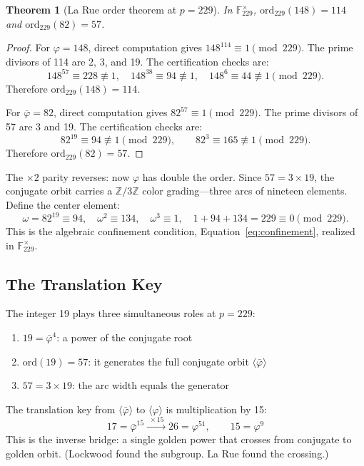 \documentclass[12pt,oneside]{article}
\theoremstyle{principia}
\newtheorem{theorem}{Theorem}[section]
\theoremstyle{definition}
\theoremstyle{remark}
\providecommand{\ZZ}{\mathbb{Z}}
\providecommand{\FF}{\mathbb{F}}
\providecommand{\vp}{\varphi}
\providecommand{\vpbar}{\bar{\varphi}}
\begin{document}
\begin{theorem}[La Rue order theorem at $p = 229$]\label{thm:larue_order}
In $\FF_{229}^\times$, $\mathrm{ord}_{229}(148) = 114$ and $\mathrm{ord}_{229}(82) = 57$.
\end{theorem}

\begin{proof}
For $\vp = 148$, direct computation gives $148^{114} \equiv 1 \pmod{229}$. The prime divisors of 114 are 2, 3, and 19. The certification checks are:
\[
148^{57} \equiv 228 \not\equiv 1, \quad 148^{38} \equiv 94 \not\equiv 1, \quad 148^{6} \equiv 44 \not\equiv 1 \pmod{229}.
\]
Therefore $\mathrm{ord}_{229}(148) = 114$.

For $\vpbar = 82$, direct computation gives $82^{57} \equiv 1 \pmod{229}$. The prime divisors of 57 are 3 and 19. The certification checks are:
\[
82^{19} \equiv 94 \not\equiv 1 \pmod{229}, \qquad 82^{3} \equiv 165 \not\equiv 1 \pmod{229}.
\]
Therefore $\mathrm{ord}_{229}(82) = 57$. \qedhere
\end{proof}

The $\times 2$ parity reverses: now $\vp$ has double the order. Since $57 = 3 \times 19$, the conjugate orbit carries a $\ZZ/3\ZZ$ color grading---three arcs of nineteen elements. Define the center element:
\[
\omega = 82^{19} \equiv 94, \quad \omega^2 \equiv 134, \quad \omega^3 \equiv 1, \quad 1 + 94 + 134 = 229 \equiv 0 \pmod{229}.
\]
This is the algebraic confinement condition, Equation~\eqref{eq:confinement}, realized in $\FF_{229}^\times$.

\subsection{The Translation Key}

The integer 19 plays three simultaneous roles at $p = 229$:
\begin{enumerate}[label=(\alph*)]
\item $19 = \vpbar^4$: a power of the conjugate root
\item $\mathrm{ord}(19) = 57$: it generates the full conjugate orbit $\langle \vpbar \rangle$
\item $57 = 3 \times 19$: the arc width equals the generator
\end{enumerate}

The translation key from $\langle \vpbar \rangle$ to $\langle \vp \rangle$ is multiplication by 15:
\begin{equation}\label{eq:key}
17 = \vpbar^{15} \xrightarrow{\;\times 15\;} 26 = \vp^{51}, \qquad 15 = \vp^9
\end{equation}
This is the inverse bridge: a single golden power that crosses from conjugate to golden orbit. (Lockwood found the subgroup. La Rue found the crossing.)
\end{document}
